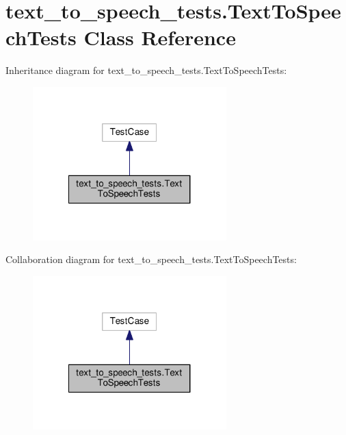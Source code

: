 \hypertarget{classtext__to__speech__tests_1_1TextToSpeechTests}{\section{text\-\_\-to\-\_\-speech\-\_\-tests.\-Text\-To\-Speech\-Tests Class Reference}
\label{classtext__to__speech__tests_1_1TextToSpeechTests}
}


Inheritance diagram for text\-\_\-to\-\_\-speech\-\_\-tests.\-Text\-To\-Speech\-Tests\-:
\nopagebreak
\begin{figure}[H]
\begin{center}
\leavevmode
\includegraphics[width=212pt]{classtext__to__speech__tests_1_1TextToSpeechTests__inherit__graph}
\end{center}
\end{figure}


Collaboration diagram for text\-\_\-to\-\_\-speech\-\_\-tests.\-Text\-To\-Speech\-Tests\-:
\nopagebreak
\begin{figure}[H]
\begin{center}
\leavevmode
\includegraphics[width=212pt]{classtext__to__speech__tests_1_1TextToSpeechTests__coll__graph}
\end{center}
\end{figure}
